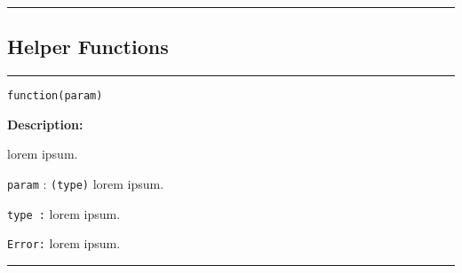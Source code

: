 \documentclass[12pt]{article}
\begin{document}
\hrule

\subsection*{Helper Functions\\}
\hrule
{\large\texttt{function(param)}}

\textbf{Description:}

lorem ipsum.

\begin{description}
    \item[Parameters:] 
    \item \texttt{param} : \texttt{(type)} lorem ipsum.

    \item[Returns:] 
    \item \texttt{type :} lorem ipsum.

    \item[Raises:] 
    \item \texttt{Error:} lorem ipsum. \\
\end{description}

\hrule
\end{document}
